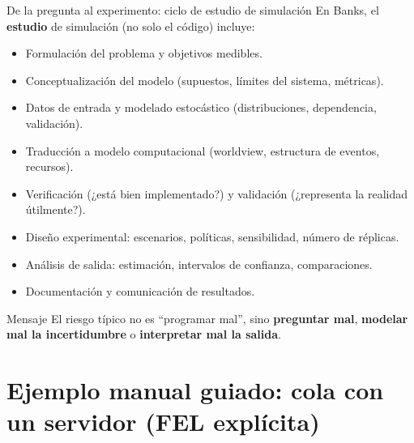 \documentclass[aspectratio=1610, 9pt]{beamer}
\begin{document}
\begin{frame}{De la pregunta al experimento: ciclo de estudio de simulación}
\small
En Banks, el \textbf{estudio} de simulación (no solo el código) incluye:
\begin{itemize}
\item Formulación del problema y objetivos medibles.
\item Conceptualización del modelo (supuestos, límites del sistema, métricas).
\item Datos de entrada y modelado estocástico (distribuciones, dependencia, validación).
\item Traducción a modelo computacional (worldview, estructura de eventos, recursos).
\item Verificación (¿está bien implementado?) y validación (¿representa la realidad útilmente?).
\item Diseño experimental: escenarios, políticas, sensibilidad, número de réplicas.
\item Análisis de salida: estimación, intervalos de confianza, comparaciones.
\item Documentación y comunicación de resultados.
\end{itemize}

\vspace{4pt}
\begin{alertblock}{Mensaje}
El riesgo típico no es “programar mal”, sino \textbf{preguntar mal}, \textbf{modelar mal la incertidumbre} o \textbf{interpretar mal la salida}.
\end{alertblock}
\end{frame}

%

\section{Ejemplo manual guiado: cola con un servidor (FEL explícita)}
\end{document}
